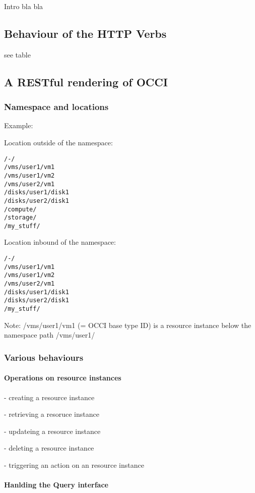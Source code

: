 \documentclass[10pt,a4paper]{article}
\begin{document}
Intro bla bla

\subsection{Behaviour of the HTTP Verbs}

see table

\subsection{A RESTful rendering of OCCI}

\subsubsection{Namespace and locations}

Example:

Location outside of the namespace:

\begin{verbatim}
/-/
/vms/user1/vm1
/vms/user1/vm2
/vms/user2/vm1
/disks/user1/disk1
/disks/user2/disk1
/compute/
/storage/
/my_stuff/
\end{verbatim}

Location inbound of the namespace:

\begin{verbatim}
/-/
/vms/user1/vm1
/vms/user1/vm2
/vms/user2/vm1
/disks/user1/disk1
/disks/user2/disk1
/my_stuff/
\end{verbatim}

Note: /vms/user1/vm1 (= OCCI base type ID) is a resource instance below the namespace path /vms/user1/

\subsubsection{Various behaviours}

\paragraph{Operations on resource instances}

- creating a resource instance

- retrieving a resoruce instance

- updateing a resource instance

- deleting a resource instance

- triggering an action on an resource instance

\paragraph{Hanlding the Query interface}
\end{document}
